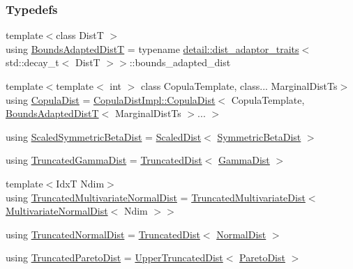 \subsubsection*{Typedefs}
\begin{DoxyCompactItemize}
\item 
{\footnotesize template$<$class DistT $>$ }\\using \hyperlink{namespaceprior__hessian_a919f0d7f51ea845224ca7f03983508a9}{Bounds\+Adapted\+DistT} = typename \hyperlink{classprior__hessian_1_1detail_1_1dist__adaptor__traits}{detail\+::dist\+\_\+adaptor\+\_\+traits}$<$ std\+::decay\+\_\+t$<$ DistT $>$$>$\+::bounds\+\_\+adapted\+\_\+dist
\item 
{\footnotesize template$<$template$<$ int $>$ class Copula\+Template, class... Marginal\+Dist\+Ts$>$ }\\using \hyperlink{namespaceprior__hessian_a40a0589f5be3c61e4c4854fcefe8855f}{Copula\+Dist} = \hyperlink{classprior__hessian_1_1CopulaDistImpl_1_1CopulaDist}{Copula\+Dist\+Impl\+::\+Copula\+Dist}$<$ Copula\+Template, \hyperlink{namespaceprior__hessian_a919f0d7f51ea845224ca7f03983508a9}{Bounds\+Adapted\+DistT}$<$ Marginal\+Dist\+Ts $>$... $>$
\item 
using \hyperlink{namespaceprior__hessian_ae84776b8f8ed86c14a5ce47a29b7a1be}{Scaled\+Symmetric\+Beta\+Dist} = \hyperlink{classprior__hessian_1_1ScaledDist}{Scaled\+Dist}$<$ \hyperlink{classprior__hessian_1_1SymmetricBetaDist}{Symmetric\+Beta\+Dist} $>$
\item 
using \hyperlink{namespaceprior__hessian_acd158ecf6698fbe5a4430df7730d3aba}{Truncated\+Gamma\+Dist} = \hyperlink{classprior__hessian_1_1TruncatedDist}{Truncated\+Dist}$<$ \hyperlink{classprior__hessian_1_1GammaDist}{Gamma\+Dist} $>$
\item 
{\footnotesize template$<$IdxT Ndim$>$ }\\using \hyperlink{namespaceprior__hessian_a99ef03c8a3e476931d451d6d944ffae5}{Truncated\+Multivariate\+Normal\+Dist} = \hyperlink{classprior__hessian_1_1TruncatedMultivariateDist}{Truncated\+Multivariate\+Dist}$<$ \hyperlink{classprior__hessian_1_1MultivariateNormalDist}{Multivariate\+Normal\+Dist}$<$ Ndim $>$$>$
\item 
using \hyperlink{namespaceprior__hessian_a47f38d4bb5d31fd3f01f5eb6ba6f1223}{Truncated\+Normal\+Dist} = \hyperlink{classprior__hessian_1_1TruncatedDist}{Truncated\+Dist}$<$ \hyperlink{classprior__hessian_1_1NormalDist}{Normal\+Dist} $>$
\item 
using \hyperlink{namespaceprior__hessian_afebdccc7e1a35836f660f8a301af9cb2}{Truncated\+Pareto\+Dist} = \hyperlink{classprior__hessian_1_1UpperTruncatedDist}{Upper\+Truncated\+Dist}$<$ \hyperlink{classprior__hessian_1_1ParetoDist}{Pareto\+Dist} $>$

\end{DoxyCompactItemize}
